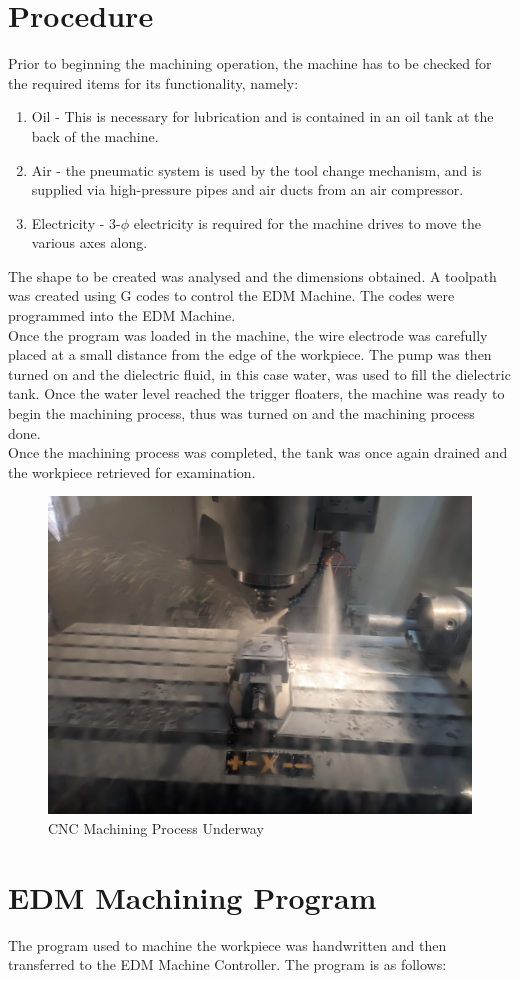 \section{Procedure}
Prior to beginning the machining operation, the machine has to be checked for the required items for its functionality, namely:
\begin{enumerate}
	\item Oil - This is necessary for lubrication and is contained in an oil tank at the back of the machine.
	\item Air - the pneumatic system is used by the tool change mechanism, and is supplied via high-pressure pipes and air ducts from an air compressor.
	\item Electricity - 3-$\phi$ electricity is required for the machine drives to move the various axes along.
\end{enumerate}
The shape to be created was analysed and the dimensions obtained. A toolpath was created using G codes to control the EDM Machine. The codes were programmed into the EDM Machine.\\
Once the program was loaded in the machine, the wire electrode was carefully placed at a small distance from the edge of the workpiece. The pump was then turned on and the dielectric fluid, in this case water, was used to fill the dielectric tank. Once the water level reached the trigger floaters, the machine was ready to begin the machining process, thus was turned on and the machining process done.\\
Once the machining process was completed, the tank was once again drained and the workpiece retrieved for examination.
\begin{figure}[h!]
	\centering
	\includegraphics[width=0.7\linewidth]{Figures/machining}
	\caption[CNC Machining Process]{CNC Machining Process Underway}
	\label{fig:machining}
\end{figure}
\section{EDM Machining Program}
The program used to machine the workpiece was  handwritten and then transferred to the EDM Machine Controller. The program is as follows:
